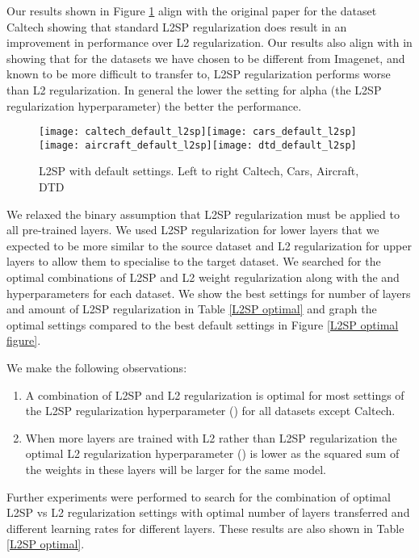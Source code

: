 \documentclass[]{article}
\begin{document}
Our results shown in Figure \ref{L2SP default} align with the original paper
\cite{li2018explicit} for the dataset Caltech showing that standard
L2SP regularization does result in an improvement in performance over
L2 regularization. Our results also align with \cite{li2020rethinking,wan2019towards}
in showing that for the datasets we have chosen to be different from
Imagenet, and known to be more difficult to transfer to, L2SP regularization
performs worse than L2 regularization. In general the lower the setting
for alpha (the L2SP regularization hyperparameter) the better the
performance.

\begin{figure}[th]


\begin{centering}
\texttt{[image: caltech\_default\_l2sp]}\texttt{[image: cars\_default\_l2sp]}
\texttt{[image: aircraft\_default\_l2sp]}\texttt{[image: dtd\_default\_l2sp]}
\caption{L2SP with default settings. Left to right Caltech, Cars, Aircraft, DTD}
\label{L2SP default}
\par\end{centering}
\end{figure}

We relaxed the binary assumption that L2SP regularization must be
applied to all pre-trained layers. We used L2SP regularization for
lower layers that we expected to be more similar to the source dataset
and L2 regularization for upper layers to allow them to specialise to
the target dataset. We searched for the optimal combinations of L2SP
and L2 weight regularization along with the  and 
hyperparameters for each dataset. We show the best settings for number
of layers and amount of L2SP regularization in Table \ref{L2SP optimal} and
graph the optimal settings compared to the best default settings in
Figure \ref{L2SP optimal figure}. 

We make the following observations:
\begin{enumerate}
\item A combination of L2SP and L2 regularization is optimal for most settings
of the L2SP regularization hyperparameter () for all datasets
except Caltech. 
\item When more layers are trained with L2 rather than L2SP regularization
the optimal L2 regularization hyperparameter () is lower as
the squared sum of the weights in these layers will be larger for
the same model. 
\end{enumerate}
Further experiments were performed to search for the combination of
optimal L2SP vs L2 regularization settings with optimal number of
layers transferred and different learning rates for different layers.
These results are also shown in Table  \ref{L2SP optimal}. 
\end{document}
